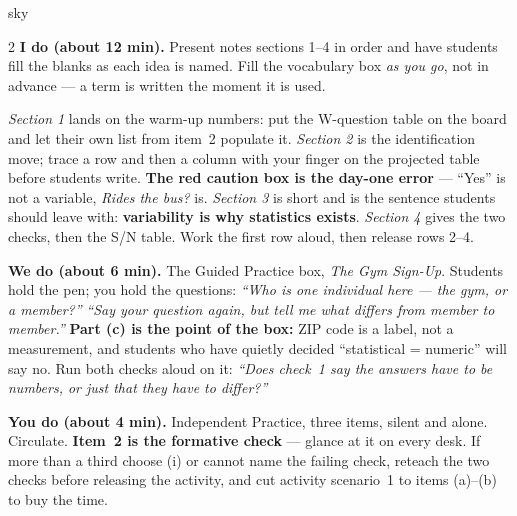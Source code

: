 \documentclass[10pt]{article}
\begin{document}
\boxguard
\begin{skillbox}{sky}
\begin{multicols}{2}
\textbf{I do (about 12 min).} Present notes sections 1--4 in order and have students fill the
blanks as each idea is named. Fill the vocabulary box \emph{as you go}, not in advance --- a term
is written the moment it is used.

\emph{Section 1} lands on the warm-up numbers: put the W-question table on the board and let
their own list from item~2 populate it. \emph{Section 2} is the identification move; trace a row
and then a column with your finger on the projected table before students write.
\textbf{The red caution box is the day-one error} --- ``Yes'' is not a variable, \emph{Rides the
bus?} is. \emph{Section 3} is short and is the sentence students should leave with:
\textbf{variability is why statistics exists}. \emph{Section 4} gives the two checks, then the
S/N table. Work the first row aloud, then release rows 2--4.

\columnbreak
\textbf{We do (about 6 min).} The Guided Practice box, \emph{The Gym Sign-Up}. Students hold the
pen; you hold the questions: \emph{``Who is one individual here --- the gym, or a member?''}
\quad \emph{``Say your question again, but tell me what differs from member to member.''}
\quad \textbf{Part (c) is the point of the box:} ZIP code is a label, not a measurement, and
students who have quietly decided ``statistical = numeric'' will say no. Run both checks aloud
on it: \emph{``Does check~1 say the answers have to be numbers, or just that they have to
differ?''}

\textbf{You do (about 4 min).} Independent Practice, three items, silent and alone. Circulate.
\textbf{Item~2 is the formative check} --- glance at it on every desk. If more than a third
choose (i) or cannot name the failing check, reteach the two checks before releasing the
activity, and cut activity scenario~1 to items (a)--(b) to buy the time.
\end{multicols}
\end{skillbox}
\end{document}
